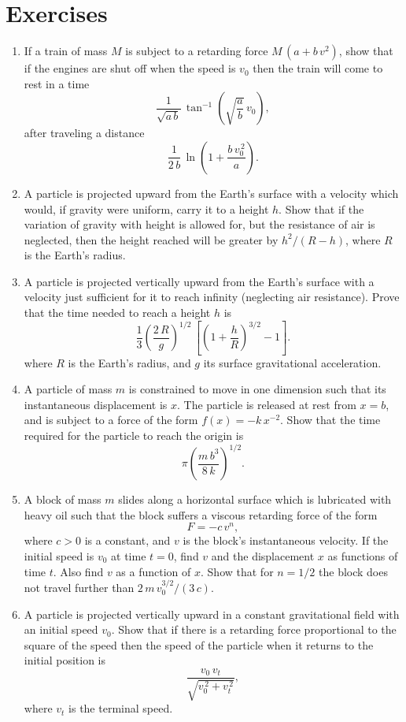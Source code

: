 \section{Exercises}
{\small
\renewcommand{\theenumi}{3.\arabic{enumi}}
\begin{enumerate}
\item If a train of mass $M$ is subject to a retarding force $M\,(a+b\,v^2)$, show that if
the engines are shut off when the speed is $v_0 $ then the train will
come to rest in a time
$$
\frac{1}{\sqrt{a\,b}}\,\tan^{-1}\left(\sqrt{\frac{a}{b}}\,v_0\right),
$$
after traveling a distance
$$
\frac{1}{2\,b}\,\ln\left(1+\frac{b\,v_0^{\,2}}{a}\right).
$$

\item A particle is projected upward from the Earth's surface with a 
velocity which would, if gravity were uniform, carry it to a height $h$.
Show that if the variation of gravity with height is allowed for, but the
resistance of air is neglected, then the height reached will be greater by $h^2/(R-h)$, where
$R$ is the Earth's radius. 

\item A particle is projected vertically upward from the Earth's surface with a velocity
just sufficient for it to reach infinity (neglecting air resistance). Prove that the time needed to
reach a height $h$ is
$$
\frac{1}{3}\left(\frac{2\,R}{g}\right)^{1/2}\,\left[\left(1+\frac{h}{R}\right)^{3/2}-1\right].
$$
where $R$ is the Earth's radius, and $g$ its surface gravitational acceleration.

\item A particle of mass $m$ is constrained to move in one dimension such that its instantaneous displacement is $x$. The particle is 
 released at rest from $x=b$, and is
 subject to a force of the form  $f(x) = - k\,x^{-2}$. Show that the time required
for the particle to reach the origin is
$$
\pi\left(\frac{m\,b^3}{8\,k}\right)^{1/2}.
$$
\item A block of mass $m$ slides along a horizontal surface which is lubricated with
heavy oil such that the block suffers a viscous retarding force
of the form
$$
F = - c\,v^n,
$$
where $c>0$ is a constant, and $v$ is the block's instantaneous velocity.
If the initial speed is $v_0$ at time $t=0$, find $v$ and the displacement
$x$ as functions of time $t$. Also find $v$ as a function of $x$. Show
that for $n=1/2$ the block does not travel further than $2\,m\,v_0^{3/2}/(3\,c)$.

 \item A particle is projected vertically upward in a constant gravitational
 field with an initial speed $v_0$. Show that if there is a retarding force
 proportional to the square of the speed then the speed of the
 particle when it returns to the initial position is
 $$
 \frac{v_0\,v_t}{\sqrt{v_0^{\,2} + v_t^{\,2}}},
 $$
 where $v_t$ is the terminal speed.
 

\end{enumerate}}
